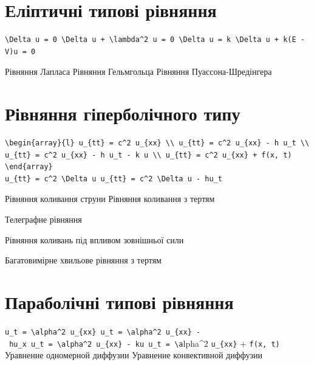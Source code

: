 \documentclass[
  ukrainian,
]{article}
\begin{document}
\section{Еліптичні типові
рівняння}\label{ux435ux43bux456ux43fux442ux438ux447ux43dux456-ux442ux438ux43fux43eux432ux456-ux440ux456ux432ux43dux44fux43dux43dux44f}

\begin{verbatim}
\Delta u = 0 \Delta u + \lambda^2 u = 0 \Delta u = k \Delta u + k(E - V)u = 0
\end{verbatim}

Рівняння Лапласа Рівняння Гельмгольца Рівняння Пуассона-Шредінгера

\section{Рівняння гіперболічного
типу}\label{ux440ux456ux432ux43dux44fux43dux43dux44f-ux433ux456ux43fux435ux440ux431ux43eux43bux456ux447ux43dux43eux433ux43e-ux442ux438ux43fux443}

\begin{verbatim}
\begin{array}{l} u_{tt} = c^2 u_{xx} \\ u_{tt} = c^2 u_{xx} - h u_t \\ u_{tt} = c^2 u_{xx} - h u_t - k u \\ u_{tt} = c^2 u_{xx} + f(x, t) \end{array}
u_{tt} = c^2 \Delta u u_{tt} = c^2 \Delta u - hu_t
\end{verbatim}

Рівняння коливання струни Рівняння коливання з тертям

Телеграфне рівняння

Рівняння коливань під впливом зовнішньої сили

Багатовимірне хвильове рівняння з тертям

\section{Параболічні типові
рівняння}\label{ux43fux430ux440ux430ux431ux43eux43bux456ux447ux43dux456-ux442ux438ux43fux43eux432ux456-ux440ux456ux432ux43dux44fux43dux43dux44f}

\texttt{u\_t\ =\ \textbackslash{}alpha\^{}2\ u\_\{xx\}\ u\_t\ =\ \textbackslash{}alpha\^{}2\ u\_\{xx\}\ -\ hu\_x\ u\_t\ =\ \textbackslash{}alpha\^{}2\ u\_\{xx\}\ -\ ku\ u\_t\ =\ \textbackslash{}a}lpha\^{}2
\texttt{u\_\{xx\}} + \texttt{f(x,\ t)} Уравнение одномерной диффузии
Уравнение конвективной диффузии
\end{document}
